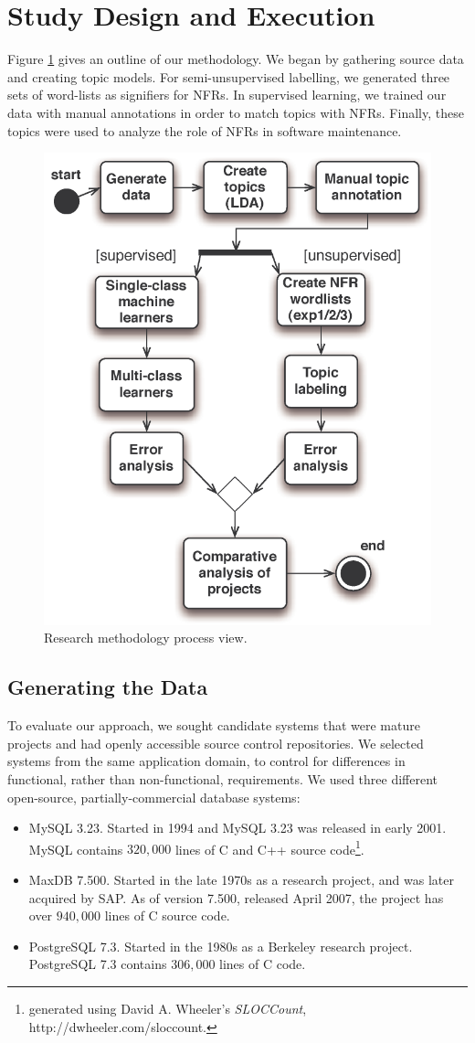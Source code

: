\documentclass[smallextended]{svjour3}       %
\begin{document}
\section{Study Design and Execution}
Figure \ref{fig:process} gives an outline of our methodology.
We began by gathering source data and creating topic models. For semi-unsupervised labelling, we generated three sets of word-lists as signifiers for NFRs.
In supervised learning, we trained our data with manual annotations in order to match topics with NFRs. Finally, these topics were used to analyze the
role of NFRs in software maintenance.

\begin{figure}
  \centering
 \includegraphics[width=.45\textwidth]{figures/process-model}
 \caption{Research methodology process view.}
  \label{fig:process}
\end{figure}

\subsection{Generating the Data}
\label{sec:wordlist}

To evaluate our approach, we sought candidate systems that were mature projects and had openly accessible source control repositories. 
We selected systems from the same application domain, to control for differences in functional, rather than non-functional, requirements. 
We used three different open-source, partially-commercial database systems:
\begin{itemize}
\item  MySQL 3.23. Started in 1994 and MySQL 3.23 was released in early 2001. MySQL contains $320,000$ lines of C and C++ source code\footnote{generated
using David A. Wheeler's \emph{SLOCCount}, {http://dwheeler.com/sloccount}.}.
\item MaxDB 7.500. Started in the late 1970s as a research project, and was later acquired by SAP. As of version 7.500, released April 2007, the project
has over $940,000$ lines of C source code. 
\item PostgreSQL 7.3. Started in the 1980s as a Berkeley research project. PostgreSQL 7.3 contains $306,000$ lines of C code.
\end{itemize}
  
\end{document}
